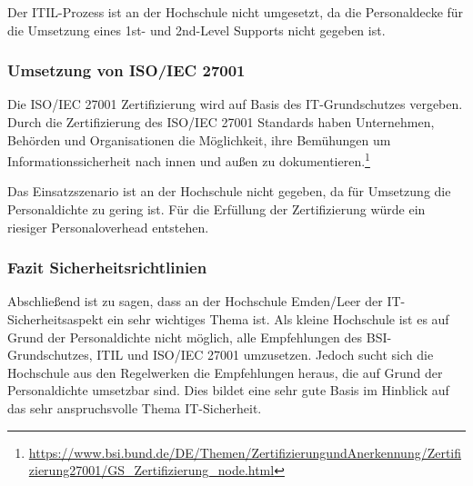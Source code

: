 Der ITIL-Prozess ist an der Hochschule nicht umgesetzt, da die Personaldecke für die Umsetzung eines 1st- und 2nd-Level Supports nicht gegeben ist.

\subsubsection{Umsetzung von ISO/IEC 27001}
Die ISO/IEC 27001 Zertifizierung wird auf Basis des IT-Grundschutzes vergeben. Durch die Zertifizierung des ISO/IEC 27001 Standards haben Unternehmen, Behörden und Organisationen die Möglichkeit, ihre Bemühungen um Informationssicherheit nach innen und außen zu dokumentieren.\footnote{\url{https://www.bsi.bund.de/DE/Themen/ZertifizierungundAnerkennung/Zertifizierung27001/GS_Zertifizierung_node.html}}

Das Einsatzszenario ist an der Hochschule nicht gegeben, da für Umsetzung die Personaldichte zu gering ist. Für die Erfüllung der Zertifizierung würde ein riesiger Personaloverhead entstehen.

\subsubsection{Fazit Sicherheitsrichtlinien}
Abschließend ist zu sagen, dass an der Hochschule Emden/Leer der IT-Sicherheitsaspekt ein sehr wichtiges Thema ist. Als kleine Hochschule ist es auf Grund der Personaldichte nicht möglich, alle Empfehlungen des BSI-Grundschutzes, ITIL und ISO/IEC 27001 umzusetzen. Jedoch sucht sich die Hochschule aus den Regelwerken die Empfehlungen heraus, die auf Grund der Personaldichte umsetzbar sind. Dies bildet eine sehr gute Basis im Hinblick auf das sehr anspruchsvolle Thema IT-Sicherheit.

